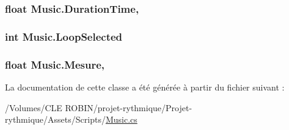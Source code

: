 \subsubsection[{Duration\+Time}]{\setlength{\rightskip}{0pt plus 5cm}float Music.\+Duration\+Time\hspace{0.3cm}{\ttfamily [get]}, {\ttfamily [set]}}\label{class_music_a20bb244d5d40d5848201077b577b0111}
\hypertarget{class_music_a08b2e446def0d17e713d4f723811b3be}{}
\subsubsection[{Loop\+Selected}]{\setlength{\rightskip}{0pt plus 5cm}int Music.\+Loop\+Selected\hspace{0.3cm}{\ttfamily [get]}}\label{class_music_a08b2e446def0d17e713d4f723811b3be}
\hypertarget{class_music_a84523fd3eb5ec2fa076d69dd0fd18373}{}
\subsubsection[{Mesure}]{\setlength{\rightskip}{0pt plus 5cm}float Music.\+Mesure\hspace{0.3cm}{\ttfamily [get]}, {\ttfamily [set]}}\label{class_music_a84523fd3eb5ec2fa076d69dd0fd18373}


La documentation de cette classe a été générée à partir du fichier suivant \+:\begin{DoxyCompactItemize}
\item 
/\+Volumes/\+C\+L\+E R\+O\+B\+I\+N/projet-\/rythmique/\+Projet-\/rythmique/\+Assets/\+Scripts/\hyperlink{_music_8cs}{Music.\+cs}\end{DoxyCompactItemize}
